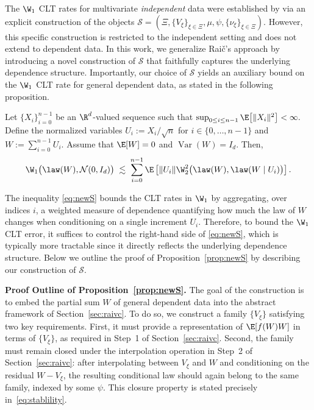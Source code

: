 \documentclass[mnsc,nonblindrev]{informs3}
\begin{document}
The $\W_1$ CLT rates for multivariate \emph{independent} data were established by \cite{raivc2018multivariate} via an explicit construction of the objects
\(
\mathcal S = (\Xi,\{V_\xi\}_{\xi\in\Xi},\mu,\psi,\{\nu_\xi\}_{\xi\in\Xi})
\).
However, this specific construction is restricted to the independent setting and 
does not extend to dependent data. In this work, we generalize Rai\v{c}'s approach  by introducing a novel construction of
$\mathcal S$ that faithfully captures the underlying dependence structure. Importantly,
our choice of $\mathcal S$ yields an auxiliary bound on the $\W_1$ CLT rate for general
dependent data, as stated in the following proposition.

\begin{proposition}\label{prop:newS}
Let $\{X_i\}_{i=0}^{n-1}$ be an $\R^d$-valued sequence such that $\sup_{0\le i\le n-1}\E\big[\|X_i\|^2\big] < \infty.$ Define the normalized variables $U_i := X_i/\sqrt{n}$ for $i\in\{0,\dots,n-1\}$ and $W := \sum_{i=0}^{n-1} U_i .$ Assume that $\E[W]=0$ and $\operatorname{Var}(W)=I_d$. Then,
\begin{equation}\label{eq:newS}
\W_1\bigl(\law(W), \mathcal N(0,I_d)\bigr)
\;\lesssim\;
\sum_{i=0}^{n-1}\E\left[
\|U_i\|\W_2^2\bigl(\law(W), \law(W \mid U_i)\bigr)
\right].
\end{equation}
\end{proposition}

The inequality \eqref{eq:newS} bounds the CLT rates in $\W_1$ by aggregating, over indices \(i\), a weighted measure of dependence quantifying how much the law of  \(W\) changes when conditioning on a single increment \(U_i\). Therefore, to bound the $\W_1$ CLT error, it suffices to control the right-hand side of
\eqref{eq:newS}, which is typically more tractable since it directly reflects the
underlying dependence structure. Below we outline the proof of
Proposition~\ref{prop:newS} by describing our construction of $\mathcal S$.



 

\noindent\textbf{Proof Outline of Proposition~\ref{prop:newS}.}
The goal of the construction is to embed the partial sum \(W\) of general dependent data into the abstract framework of Section~\ref{sec:raivc}. To do so, we construct a family \(\{V_\xi\}\) satisfying two key requirements. 
First, it must provide a representation of \(\E[f(W)W]\) in terms of \(\{V_\xi\}\), as required in Step~1 of Section~\ref{sec:raivc}. 
Second, the family must remain closed under the interpolation operation in Step~2 of Section~\ref{sec:raivc}: after interpolating between \(V_\xi\) and \(W\) and conditioning on the residual \(W-V_\xi\), the resulting conditional law should again belong to the same family, indexed by some \(\psi\). 
This closure property is stated precisely in~\eqref{eq:stablility}.
\end{document}
